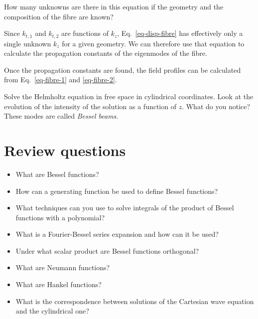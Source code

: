 \begin{cue}
How many unknowns are there in this equation if the geometry and the composition of the fibre are known?  
\end{cue}

Since $k_{t,1}$ and $k_{t,2}$ are functions of $k_z$, Eq.~\ref{eq-disp-fibre} has effectively only a single unknown $k_z$ for a given geometry. We can therefore use that equation to calculate the propagation constants of the eigenmodes of the fibre.

Once the propagation constants are found, the field profiles can be calculated from Eq.~\ref{eq-fibre-1} and \ref{eq-fibre-2}.


\begin{exer}
Solve the Helmholtz equation in free space in cylindrical coordinates. Look at the evolution of the intensity of the solution as a function of $z$. What do you notice? These modes are called \emph{Bessel beams}.
\end{exer}



\section*{Review questions}

\begin{itemize}
\item What are Bessel functions?  
\item How can a generating function be used to define Bessel functions?
\item What techniques can you use to solve integrals of the product of Bessel functions with a polynomial?
\item What is a Fourier-Bessel series expansion and how can it be used?
\item Under what scalar product are Bessel functions orthogonal?
\item What are Neumann functions?
\item What are Hankel functions?
\item What is the correspondence between solutions of the Cartesian wave equation and the cylindrical one?   
\end{itemize}

